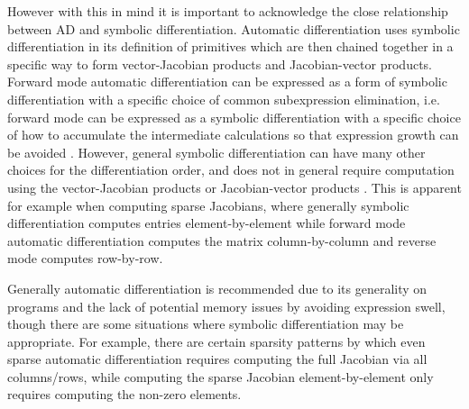 However with this in mind it is important to acknowledge the close relationship between AD and symbolic differentiation.
Automatic differentiation uses symbolic differentiation in its definition of primitives which are then chained together in a specific way to form vector-Jacobian products and Jacobian-vector products. 
Forward mode automatic differentiation can be expressed as a form of symbolic differentiation with a specific choice of common subexpression elimination, i.e. forward mode can be expressed as a symbolic differentiation with a specific choice of how to accumulate the intermediate calculations so that expression growth can be avoided \cite{juedes1991taxonomy, Elliott_2018, Laue2020}.
However, general symbolic differentiation can have many other choices for the differentiation order, and does not in general require computation using the vector-Jacobian products or Jacobian-vector products \cite{Baydin_Pearlmutter_Radul_Siskind_2015}. This is apparent for example when computing sparse Jacobians, where generally symbolic differentiation computes entries element-by-element while forward mode automatic differentiation computes the matrix column-by-column and reverse mode computes row-by-row. 

Generally automatic differentiation is recommended due to its generality on programs and the lack of potential memory issues by avoiding expression swell, though there are some situations where symbolic differentiation may be appropriate. For example, there are certain sparsity patterns by which even sparse automatic differentiation requires computing the full Jacobian via all columns/rows, while computing the sparse Jacobian element-by-element only requires computing the non-zero elements.
